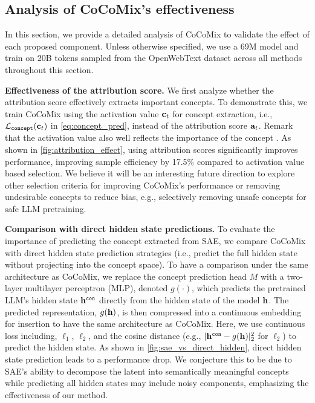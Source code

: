 \documentclass[]{fairmeta}
\newcommand{\sname}{CoCoMix\xspace}
\begin{document}


\subsection{Analysis of  \sname's effectiveness }
\label{sec:analysis}

In this section, we provide a detailed analysis of \sname to validate the effect of each proposed component. Unless otherwise specified, we use a 69M model and train on 20B tokens sampled from the OpenWebText dataset across all methods throughout this section.

\textbf{Effectiveness of the attribution score.} We first analyze whether the attribution score effectively extracts important concepts. To demonstrate this, we train \sname using the activation value ${\mathbf{c}}_t$ for concept extraction, i.e., $\mathcal{L}_{\mathtt{concept}}({\mathbf{c}}_t)$ in \autoref{eq:concept_pred}, instead of the attribution score ${\mathbf{a}}_t$. Remark that the activation value also well reflects the importance of the concept \citep{bricken2023monosemanticity}. As shown in \autoref{fig:attribution_effect}, using attribution scores significantly improves performance, improving sample efficiency by 17.5\% compared to activation value based selection. We believe it will be an interesting future direction to explore other selection criteria for improving \sname's performance or removing undesirable concepts to reduce bias, e.g., selectively removing unsafe concepts for safe LLM pretraining.

\textbf{Comparison with direct hidden state predictions.} To evaluate the importance of predicting the concept extracted from SAE, we compare \sname with direct hidden state prediction strategies (i.e., predict the full hidden state without projecting into the concept space). To have a comparison under the same architecture as \sname, we replace the concept prediction head $M$ with a two-layer multilayer perceptron (MLP), denoted $g(\cdot)$, which predicts the pretrained LLM's hidden state ${\mathbf{h}}^{\mathtt{con}}$ directly from the hidden state of the model ${\mathbf{h}}$. The predicted representation, $g({\mathbf{h}})$, is then compressed into a continuous embedding for insertion to have the same architecture as \sname. Here, we use continuous loss including, $\ell_1$, $\ell_2$, and the cosine distance (e.g., $\lvert {\mathbf{h}}^{\mathtt{con}} - g({\mathbf{h}}) \rvert_2^2$ for $\ell_2$) to predict the hidden state. As shown in \autoref{fig:sae_vs_direct_hidden}, direct hidden state prediction leads to a performance drop. We conjecture this to be due to SAE's ability to decompose the latent into semantically meaningful concepts while predicting all hidden states may include noisy components, emphasizing the effectiveness of our method.
\end{document}
